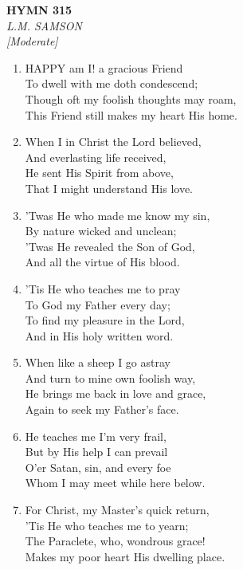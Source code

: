 \documentclass[11pt,a4paper]{article}
\begin{document}
\newpage
\begin{center}
    {\Large \textbf{HYMN 315}}
    \\
    \textit{L.M. SAMSON}
    \\
    \textit{\small [Moderate]}
\end{center}
\vspace{1em}

\begin{enumerate}
    \item HAPPY am I! a gracious Friend \\
        To dwell with me doth condescend; \\
        Though oft my foolish thoughts may roam, \\
        This Friend still makes my heart His home.

    \item When I in Christ the Lord believed, \\
        And everlasting life received, \\
        He sent His Spirit from above, \\
        That I might understand His love.

    \item 'Twas He who made me know my sin, \\
        By nature wicked and unclean; \\
        'Twas He revealed the Son of God, \\
        And all the virtue of His blood.

    \item 'Tis He who teaches me to pray \\
        To God my Father every day; \\
        To find my pleasure in the Lord, \\
        And in His holy written word.

    \item When like a sheep I go astray \\
        And turn to mine own foolish way, \\
        He brings me back in love and grace, \\
        Again to seek my Father's face.

    \item He teaches me I'm very frail, \\
        But by His help I can prevail \\
        O'er Satan, sin, and every foe \\
        Whom I may meet while here below.

    \item For Christ, my Master's quick return, \\
        'Tis He who teaches me to yearn; \\
        The Paraclete, who, wondrous grace! \\
        Makes my poor heart His dwelling place.

\end{enumerate}
\end{document}
